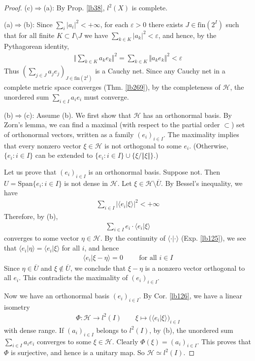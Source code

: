 \documentclass[12pt,b5paper,notitlepage]{article}
\theoremstyle{definition}
\theoremstyle{plain}
\newcommand{\ovl}{\overline}
\newcommand{\Span}{\mathrm{Span}}
\newcommand{\bk}[1]{\langle {#1}\rangle}
\newcommand{\fin}{\mathrm{fin}}
\newcommand{\eps}{\varepsilon}
\newcommand{\MH}{\mathcal H}
\numberwithin{equation}{section}
\begin{document}
\begin{proof}
(c)$\Rightarrow$(a): By Prop. \ref{lb38}, $l^2(X)$ is complete.

(a)$\Rightarrow$(b): Since $\sum_i |a_i|^2<+\infty$, for each $\eps>0$ there exists $J\in\fin(2^I)$ such that for all finite $K\subset I\setminus J$ we have $\sum_{k\in K}|a_k|^2<\eps$, and hence, by the Pythagorean identity,
\begin{align*}
\Big\Vert \sum_{k\in K}a_ke_k\Big\Vert^2=\sum_{k\in K}\Vert a_ke_k\Vert^2<\eps
\end{align*}
Thus $(\sum_{j\in J}a_je_j)_{J\in\fin(2^I)}$ is a Cauchy net. Since any Cauchy net in a complete metric space converges (Thm. \ref{lb269}), by the completeness of $\MH$, the unordered sum $\sum_{i\in I}a_ie_i$ must converge.

(b)$\Rightarrow$(c): Assume (b). We first show that $\MH$ has an orthonormal basis. By Zorn's lemma, we can find a maximal (with respect to the partial order $\subset$) set of orthonormal vectors, written as a family $(e_i)_{i\in I}$. The maximality implies that every nonzero vector $\xi\in \MH$ is not orthogonal to some $e_i$. (Otherwise, $\{e_i:i\in I\}$ can be extended to $\{e_i:i\in I\}\cup\{\xi/\Vert\xi\Vert\}$.)

Let us prove that $(e_i)_{i\in I}$ is an orthonormal basis. Suppose not. Then $U=\Span\{e_i:i\in I\}$ is not dense in $\MH$. Let $\xi\in \MH\setminus \ovl{U}$. By Bessel's inequality, we have
\begin{align*}
\sum_{i\in I}|\bk{e_i|\xi}|^2<+\infty
\end{align*}
Therefore, by (b),
\begin{align}
\sum_{i\in I}e_i\cdot\bk{e_i|\xi}
\end{align}
converges to some vector $\eta\in \MH$. By the continuity of $\bk{\cdot|\cdot}$ (Exp. \ref{lb125}), we see that $\bk{e_i|\eta}=\bk{e_i|\xi}$ for all $i$, and hence
\begin{align}\label{eq74}
\bk{e_i|\xi-\eta}=0\qquad\text{ for all }i\in I
\end{align}
Since $\eta\in\ovl U$ and $\xi\notin\ovl U$, we conclude that $\xi-\eta$ is a nonzero vector orthogonal to all $e_i$. This contradicts the maximality of $(e_i)_{i\in I}$.

Now we have an orthonormal basis $(e_i)_{i\in I}$. By Cor. \ref{lb126}, we have a linear isometry
\begin{align*}
\Phi:\MH\rightarrow l^2(I)\qquad \xi\mapsto \big(\bk{e_i|\xi}\big)_{i\in I}
\end{align*}
with dense range. If $(a_i)_{i\in I}$ belongs to $l^2(I)$, by (b), the unordered sum $\sum_{i\in I}a_ie_i$ converges to some $\xi\in \MH$. Clearly $\Phi(\xi)=(a_i)_{i\in I}$. This proves that $\Phi$ is surjective, and hence is a unitary map. So $\MH\simeq l^2(I)$.
\end{proof}
\end{document}
